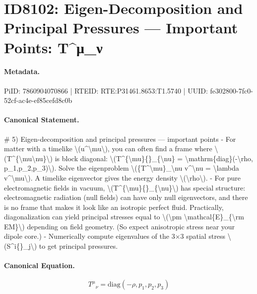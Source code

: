 \section*{ID8102: Eigen-Decomposition and Principal Pressures — Important Points: T\textasciicircum{}μ\_ν}
\paragraph{Metadata.}
PiID: 7860904070866 | RTEID: RTE:P31461.8653:T1.5740 | UUID: fe302800-7fc0-52cf-ac4e-ef85cefd8c0b

\paragraph{Canonical Statement.}
\# 5) Eigen-decomposition and principal pressures — important points - For matter with a timelike \textbackslash{}(u\textasciicircum{}\textbackslash{}mu\textbackslash{}), you can often find a frame where \textbackslash{}(T\textasciicircum{}\{\textbackslash{}mu\textbackslash{}nu\}\textbackslash{}) is block diagonal: \textbackslash{}(T\textasciicircum{}\{\textbackslash{}mu\}\{\}\_\{\textbackslash{}nu\} = \textbackslash{}mathrm\{diag\}(-\textbackslash{}rho, p\_1,p\_2,p\_3)\textbackslash{}). Solve the eigenproblem \textbackslash{}(\{T\textasciicircum{}\textbackslash{}mu\}\_\textbackslash{}nu v\textasciicircum{}\textbackslash{}nu = \textbackslash{}lambda v\textasciicircum{}\textbackslash{}mu\textbackslash{}). A timelike eigenvector gives the energy density \textbackslash{}(\textbackslash{}rho\textbackslash{}). - For pure electromagnetic fields in vacuum, \textbackslash{}(T\textasciicircum{}\{\textbackslash{}mu\}\{\}\_\{\textbackslash{}nu\}\textbackslash{}) has special structure: electromagnetic radiation (null fields) can have only null eigenvectors, and there is no frame that makes it look like an isotropic perfect fluid. Practically, diagonalization can yield principal stresses equal to \textbackslash{}(\textbackslash{}pm \textbackslash{}mathcal\{E\}\_\{\textbackslash{}rm EM\}\textbackslash{}) depending on field geometry. (So expect anisotropic stress near your dipole core.) - Numerically compute eigenvalues of the 3×3 spatial stress \textbackslash{}(S\textasciicircum{}i\{\}\_j\textbackslash{}) to get principal pressures.

\paragraph{Canonical Equation.}
\[
T^{\mu}{}_{\nu} = \mathrm{diag}(-\rho, p_1,p_2,p_3)
\]

